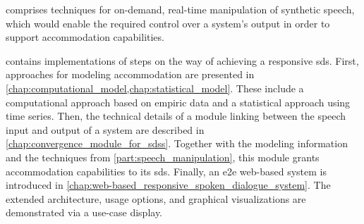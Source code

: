  comprises techniques for on-demand, real-time manipulation of synthetic speech, which would enable the required control over a system's output in order to support accommodation capabilities.

 contains implementations of steps on the way of achieving a responsive \acl{sds}.
First, approaches for modeling accommodation are presented in \cref{chap:computational_model,chap:statistical_model}.
These include a computational approach based on empiric data and a statistical approach using time series.
Then, the technical details of a module linking between the speech input and output of a system are described in \cref{chap:convergence_module_for_sdss}.
Together with the modeling information and the techniques from \cref{part:speech_manipulation}, this module grants accommodation capabilities to its \acl{sds}.
Finally, an \acl{e2e} web-based system is introduced in \cref{chap:web-based_responsive_spoken_dialogue_system}.
The extended architecture, usage options, and  graphical visualizations are demonstrated via a use-case display.

\clearpage %
\pagestyle{fancy} %
\renewcommand{\headrulewidth}{0.4pt} %
\renewcommand{\chaptermark}[1]{\markboth{Chapter~\thechapter~--~#1}{}} %
\renewcommand{\sectionmark}[1]{\markright{\thesection\quad#1}} %
\fancyhead[LO]{\leftmark} %
\fancyhead[RE]{\rightmark} %

\addtocounter{page}{1} %
